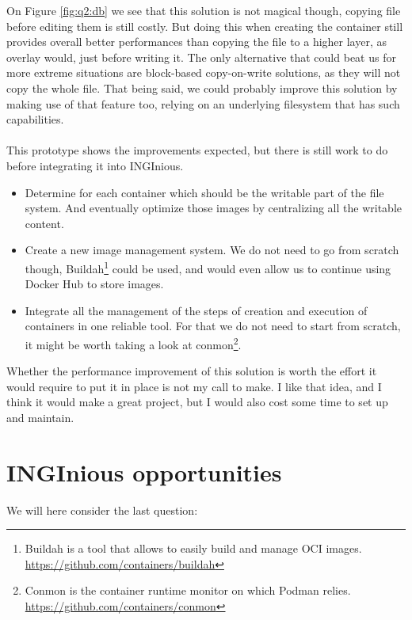 On Figure \ref{fig:q2:db} we see that this solution is not magical though, copying file before editing them is still costly.  But doing this when creating the container still provides overall better performances than copying the file to a higher layer, as overlay would, just before writing it.  The only alternative that could beat us for more extreme situations are block-based copy-on-write solutions, as they will not copy the whole file.  That being said, we could probably improve this solution by making use of that feature too, relying on an underlying filesystem that has such capabilities.

\paragraph{}This prototype shows the improvements expected, but there is still work to do before integrating it into INGInious.
\begin{itemize}
  \item Determine for each container which should be the writable part of the file system.  And eventually optimize those images by centralizing all the writable content.
  \item Create a new image management system.  We do not need to go from scratch though, Buildah\footnote{Buildah is a tool that allows to easily build and manage OCI images. \href{https://github.com/containers/buildah}{https://github.com/containers/buildah}} could be used, and would even allow us to continue using Docker Hub to store images.
  \item Integrate all the management of the steps of creation and execution of containers in one reliable tool.  For that we do not need to start from scratch, it might be worth taking a look at conmon\footnote{Conmon is the container runtime monitor on which Podman relies.  \href{https://github.com/containers/conmon}{https://github.com/containers/conmon}}.
\end{itemize}

Whether the performance improvement of this solution is worth the effort it would require to put it in place is not my call to make. I like that idea, and I think it would make a great project, but I would also cost some time to set up and maintain.

\section{INGInious opportunities}
We will here consider the last question:
\begin{center}
\end{center}


